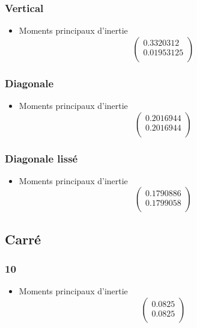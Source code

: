 \documentclass[a4paper,12pt]{report}
\begin{document}
\subsubsection*{Vertical}
\begin{itemize}

\item Moments principaux d'inertie
\[
   \left (
   \begin{array}{c}
      0.3320312 \\
      0.01953125 \\
   \end{array}
   \right )
\]

\end{itemize}

\subsubsection*{Diagonale}
\begin{itemize}

\item Moments principaux d'inertie
\[
   \left (
   \begin{array}{c}
      0.2016944 \\
      0.2016944 \\
   \end{array}
   \right )
\]

\end{itemize}

\subsubsection*{Diagonale lissé}
\begin{itemize}
\item Moments principaux d'inertie
\[
   \left (
   \begin{array}{c}
      0.1790886 \\
      0.1799058 \\
   \end{array}
   \right )
\]

\end{itemize}
\subsection*{Carré}
\subsubsection*{10}
\begin{itemize}

\item Moments principaux d'inertie
\[
   \left (
   \begin{array}{c}
      0.0825 \\
      0.0825 \\
   \end{array}
   \right )
\]

\end{itemize}
\end{document}

